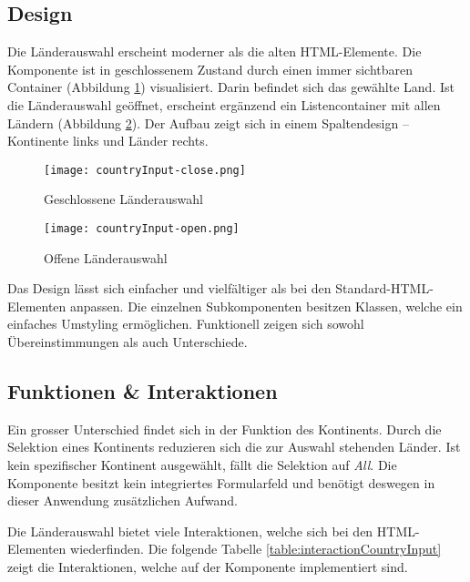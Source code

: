 \subsection{Design}
\label{sec:countryChoiceDesign}

Die Länderauswahl erscheint moderner als die alten HTML-Elemente. 
Die Komponente ist in geschlossenem Zustand durch einen immer sichtbaren Container (Abbildung \ref{img:countryInputComponentClose}) visualisiert. 
Darin befindet sich das gewählte Land. 
Ist die Länderauswahl geöffnet, erscheint ergänzend ein Listencontainer mit allen Ländern (Abbildung \ref{img:countryInputComponentOpen}). 
Der Aufbau zeigt sich in einem Spaltendesign – Kontinente links und Länder rechts. 

\begin{figure}[!htb]
    \centering
    \texttt{[image: countryInput-close.png]}
    \caption{\centering Geschlossene Länderauswahl}
    \label{img:countryInputComponentClose}
\end{figure}

\begin{figure}[!htb]
    \centering
    \texttt{[image: countryInput-open.png]}
    \caption{\centering Offene Länderauswahl}
    \label{img:countryInputComponentOpen}
\end{figure}

Das Design lässt sich einfacher und vielfältiger als bei den Standard-HTML-Elementen anpassen. 
Die einzelnen Subkomponenten besitzen Klassen, welche ein einfaches Umstyling ermöglichen. 
Funktionell zeigen sich sowohl Übereinstimmungen als auch Unterschiede. 


\subsection{Funktionen \& Interaktionen}
\label{sec:countryChoiceFunction}

Ein grosser Unterschied findet sich in der Funktion des Kontinents. 
Durch die Selektion eines Kontinents reduzieren sich die zur Auswahl stehenden Länder. 
Ist kein spezifischer Kontinent ausgewählt, fällt die Selektion auf \emph{All}. 
Die Komponente besitzt kein integriertes Formularfeld und benötigt deswegen in dieser Anwendung zusätzlichen Aufwand. 

Die Länderauswahl bietet viele Interaktionen, welche sich bei den HTML-Elementen wiederfinden. 
Die folgende Tabelle \ref{table:interactionCountryInput} zeigt die Interaktionen, welche auf der Komponente implementiert sind. 

